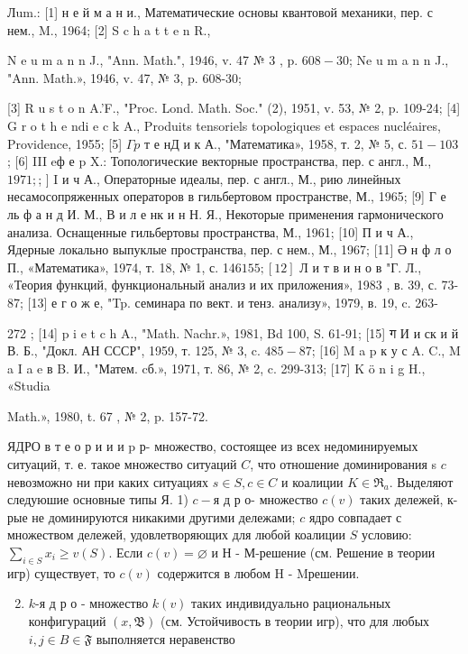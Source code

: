 \documentclass[10pt]{article}
\begin{document}
Лum.: [1] н е й м а н и., Математические основы квантовой механики, пер. с нем., M., 1964; [2] S c h a t t e n R.,

N e u m a n n J., "Ann. Math.", 1946, v. 47 № 3 , p. $608-30$; Ne u m a n n J., "Ann. Math.», 1946, v. 47, № 3, p. 608-30;

[3] R u s t o n A.'F., "Proc. Lond. Math. Soc." (2), 1951, v. 53, № 2, p. 109-24; [4] G r o t $\mathrm{h}$ e $\mathrm{n} \mathrm{d} \mathrm{i}$ e c $\mathrm{k}$ A., Produits tensoriels topologiques et espaces nucléaires, Providence, 1955; [5] $\Gamma p$ т е нД и к А., "Математика», 1958, т. 2, № 5, с. $51-103$; [6] III eф е p X.: Топологические векторные пространства, пер. с англ., М., $1971 ;$; ] I и ч А., Операторные идеалы, пер. с англ., М., рию линейных несамосопряженных операторов в гильбертовом пространстве, М., 1965; [9] Г е ль ф а н д И. М., В и л е нк и н Н. Я., Некоторые применения гармонического анализа. Оснащенные гильбертовы пространства, М., 1961; [10] П и ч А., Ядерные локально выпуклые пространства, пер. с нем., М., 1967; [11] Ә н ф л о П., «Математика», 1974, т. 18, № 1, с. 146$155 ;[12]$ Л и т в и н о в "Г. Л., «Теория функций, функциональный анализ и их приложения», 1983 , в. 39, с. 73-87; [13] е г о ж е, "Tp. семинара по вект. и тенз. анализу», 1979, в. 19, c. 263-

272 ; [14] p i e t c h A., "Math. Nachr.», 1981, Bd 100, S. 61-91; [15] ग И и ск и й В. Б., "Докл. АН СССР", 1959, т. 125, № 3, c. $485-87$; [16] M a p к у с A. C., M a I a e в B. И., "Матем. cб.», 1971, т. 86, № 2, c. 299-313; [17] K ö n i g H., «Studia

Math.», 1980, t. 67 , № 2, p. 157-72.



ЯДРО в т е о р и и и $\mathrm{p}$ р- множество, состоящее из всех недоминируемых ситуаций, т. е. такое множество ситуаций $C$, что отношение доминирования s $c$ невозможно ни при каких ситуациях $s \in S, c \in C$ и коалиции $K \in \mathfrak{R}_{a}$. Выделяют следуюшие основные типы $Я$. 1) $c-я$ д р о- множество $c(v)$ таких дележей, к-рые не доминируются никакими другими дележами; $c$ ядро совпадает с множеством дележей, удовлетворяющих для любой коалиции $S$ условию: $\sum_{i \in S} x_{i} \geqslant v(S)$. Если $c(v)=\varnothing$ и Н - М-решение (см. Решение в теории игр) существует, то $c(v)$ содержится в любом H - Mрешении.



\begin{enumerate}

  \setcounter{enumi}{1}

  \item $k$-я д р о - множество $k(v)$ таких индивидуально рациональных конфигураций $(x, \mathfrak{B})$ (см. Устойчивость в теории игр), что для любых $i, j \in B \in \mathfrak{F}$ выполняется неравенство

\end{enumerate}
\end{document}
